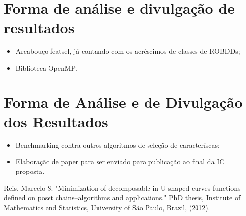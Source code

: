 \documentclass[12pt]{article}
\begin{document}
\section{Forma de análise e divulgação de resultados}

\begin{itemize}
\item Arcabouço featsel, já contando com os acréscimos de classes de ROBDDs;

\item Biblioteca OpenMP.
\end{itemize}

\section{Forma de Análise e de Divulgação dos Resultados}

\begin{itemize}
\item Benchmarking contra outros algoritmos de seleção de caracteríscas;

\item Elaboração de paper para ser enviado para publicação ao final da IC proposta.
\end{itemize}

\newpage
\begin{thebibliography}{}
    Reis, Marcelo S. "Minimization of decomposable in U-shaped curves 
    functions defined on poset chains–algorithms and applications."
    PhD thesis, Institute of Mathematics and Statistics, University of
    São Paulo, Brazil, (2012).


\end{thebibliography}
\end{document}
